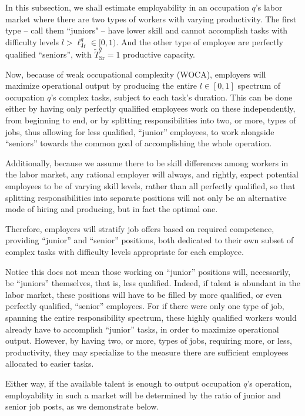 \documentclass[hidelinks, nonatbib]{elsarticle}
\begin{document}
In this subsection, we shall estimate employability in an occupation $q$'s labor market where there are two types of workers with varying productivity. The first type -- call them ``juniors" -- have lower skill and cannot accomplish tasks with difficulty levels $l > \ell_{\text{Jr}}^{q} \in [0,1)$. And the other type of employee are perfectly qualified ``seniors'', with $\tilde{T}_{\text{Sr}}^{q} = 1$ productive capacity.

Now, because of weak occupational complexity (WOCA), employers will maximize operational output by producing the entire $l \in [0,1]$ spectrum of occupation $q$'s complex tasks, subject to each task's duration. This can be done either by having only perfectly qualified employees work on these independently, from beginning to end, or by splitting responsibilities into two, or more, types of jobs, thus allowing for less qualified, ``junior'' employees, to work alongside ``seniors'' towards the common goal of accomplishing the whole operation.

Additionally, because we assume there to be skill differences among workers in the labor market, any rational employer will always, and rightly, expect potential employees to be of varying skill levels, rather than all perfectly qualified, so that splitting responsibilities into separate positions will not only be an alternative mode of hiring and producing, but in fact the optimal one.

Therefore, employers will stratify job offers based on required competence, providing ``junior'' and ``senior'' positions, both dedicated to their own subset of complex tasks with difficulty levels appropriate for each employee.

Notice this does not mean those working on ``junior'' positions will, necessarily, be ``juniors'' themselves, that is, less qualified. Indeed, if talent is abundant in the labor market, these positions will have to be filled by more qualified, or even perfectly qualified, ``senior'' employees. For if there were only one type of job, spanning the entire responsibility spectrum, these highly qualified workers would already have to accomplish ``junior'' tasks, in order to maximize operational output. However, by having two, or more, types of jobs, requiring more, or less, productivity, they may specialize to the measure there are sufficient employees allocated to easier tasks.

Either way, if the available talent is enough to output occupation $q$'s operation, employability in such a market will be determined by the ratio of junior and senior job posts, as we demonstrate below.
\end{document}
